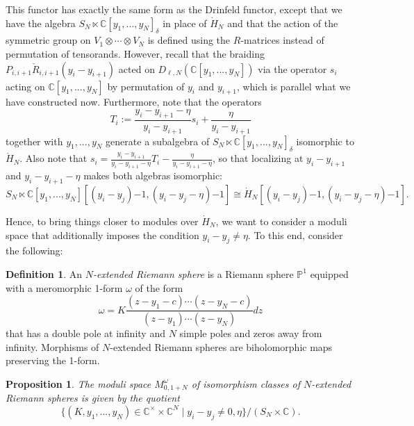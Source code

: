\documentclass[11pt]{report}
\newtheorem{prop}[theorem]{Proposition}
\theoremstyle{definition}
\newtheorem{definition}[theorem]{Definition}
\theoremstyle{remark}
\theoremstyle{remark}
\newcommand{\C}{\mathbb{C}}
\renewcommand{\P}{\mathbb{P}}
\begin{document}
This functor has exactly the same form as the Drinfeld functor, except that we have the algebra $S_N \ltimes \C[y_1,...,y_N]_\delta$ in place of $\dot H_N$ and that the action of the symmetric group on $V_1 \otimes \cdots \otimes V_N$ is defined using the $R$-matrices instead of permutation of tensorands. However, recall that the braiding $P_{i,i+1} \check R_{i,i+1}(y_i-y_{i+1})$ acted on $D_{\ell,N}(\C[y_1,...,y_N])$ via the operator $s_i$ acting on $\C[y_1,...,y_N]$ by permutation of $y_i$ and $y_{i+1}$, which is parallel what we have constructed now. Furthermore, note that the operators
\begin{equation*}
T_i := \frac{y_i-y_{i+1}-\eta}{y_i-y_{i+1}} s_i + \frac{\eta}{y_i-y_{i+1}}
\end{equation*}
together with $y_1,...,y_N$ generate a subalgebra of $S_N \ltimes \C[y_1,...,y_N]_\delta$ isomorphic to $\dot H_N$. Also note that $s_i = \frac{y_i-y_{i+1}}{y_i-y_{i+1}-\eta} T_i - \frac{\eta}{y_i-y_{i+1}-\eta}$, so that localizing at $y_i-y_{i+1}$ and $y_i-y_{i+1}-\eta$ makes both algebras isomorphic:
\begin{equation*}
S_N \ltimes \C[y_1,...,y_N][(y_i-y_j){-1},(y_i-y_j-\eta){-1}] \cong \dot H_N[(y_i-y_j){-1},(y_i-y_j-\eta){-1}].
\end{equation*}

Hence, to bring things closer to modules over $\dot H_N$, we want to consider a moduli space that additionally imposes the condition $y_i-y_j \neq \eta$. To this end, consider the following:

\begin{definition}
An \emph{$N$-extended Riemann sphere} is a Riemann sphere $\P^1$ equipped with a meromorphic 1-form $\omega$ of the form
\begin{equation*}
\omega
= K \frac{(z-y_1-c) \cdots (z-y_N-c)}{(z-y_1) \cdots (z-y_N)} dz
\end{equation*}
that has a double pole at infinity and $N$ simple poles and zeros away from infinity. Morphisms of $N$-extended Riemann spheres are biholomorphic maps preserving the 1-form.
\end{definition}

\begin{prop}
The moduli space $M_{0,1+N}^\omega$ of isomorphism classes of $N$-extended Riemann spheres is given by the quotient
\begin{equation*}
\{ (K, y_1,...,y_N) \in \C^\times \times \C^N \mid y_i-y_j \neq 0,\eta \}/(S_N \times \C).
\end{equation*}
\end{prop}
\end{document}
